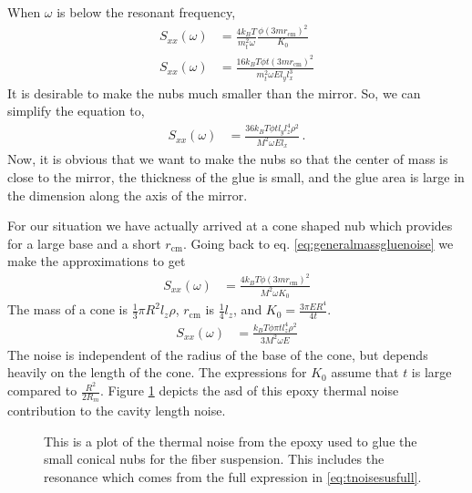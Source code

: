 When $\omega$ is below the resonant frequency,
\begin{align}
S_{xx}(\omega) &= \frac{4k_BT}{m_t^2 \omega}
  \frac{\phi(3mr_{\mathrm{cm}})^2}{K_0} \label{eq:generalmassgluenoise} \\
S_{xx}(\omega) &= \frac{16k_BT\phi t(3mr_{\mathrm{cm}})^2}{m_t^2 \omega El_yl_x^3}
\end{align}
It is desirable to make the nubs much smaller than the mirror.
So, we can simplify the equation to,
\begin{align}
S_{xx}(\omega) &= \frac{36k_BT\phi t l_yl_z^4\rho^2}{M^2\omega El_x} \,.
\end{align}
Now, it is obvious that we want to make the nubs so that the center of mass is
close to the mirror, the thickness of the glue is small, and the glue area is
large in the dimension along the axis of the mirror.

For our situation we have actually arrived at a cone shaped nub which provides
for a large base and a short $r_{\mathrm{cm}}$. Going back to eq.
\eqref{eq:generalmassgluenoise} we make the approximations to get
\begin{align}
S_{xx}(\omega) &= \frac{4k_BT\phi(3mr_{\mathrm{cm}})^2}{M^2 \omega K_0}
\end{align}
The mass of a cone is $\frac{1}{3} \pi R^2 l_z \rho$, $r_{\mathrm{cm}}$ is
$\frac{1}{4} l_z$, and $K_0 = \frac{3\pi ER^4}{4t}$.
\begin{align}
S_{xx}(\omega) &= \frac{k_BT\phi \pi t l_z^4\rho^2}{3M^2 \omega E}
\end{align}
The noise is independent of the radius of the base of the cone, but depends
heavily on the length of the cone. The expressions for $K_0$ assume that
$t$ is large compared to $\frac{R^2}{2R_m}$. Figure \ref{fig:tnoisec}
depicts the \ac{asd} of this epoxy thermal noise contribution to the cavity
length noise.

\begin{figure}[htbp]
  \caption[Epoxy Thermal Noise Contribution to Trap Length]{This is a plot
    of the thermal noise from the epoxy used to glue the small conical nubs
    for the fiber suspension. This includes the resonance which comes from
    the full expression in \eqref{eq:tnoisesusfull}.}
  \label{fig:tnoisec}
\end{figure}


